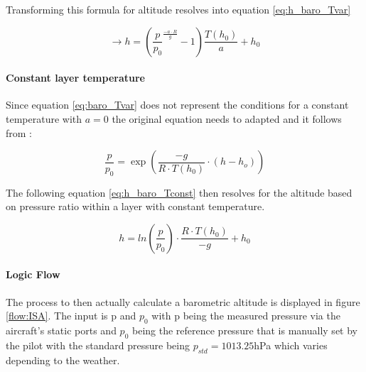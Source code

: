 Transforming this formula for altitude resolves into equation \ref{eq:h_baro_Tvar}

\begin{equation}
    \rightarrow h = \left(\frac{p}{p_0}^{\frac{-a \cdot R}{g}}-1\right)\frac{T(h_0)}{a}+h_0
    \label{eq:h_baro_Tvar}
\end{equation}

\paragraph{Constant layer temperature}

Since equation \ref{eq:baro_Tvar} does not represent the conditions for a constant temperature with $a = 0$ the original equation needs to adapted and it follows from \textcite{iso_standard_1975}:

\begin{equation}
    \frac{p}{p_0}= \exp\left(\frac{-g}{R \cdot T(h_0)}\cdot(h-h_o)\right)
    \label{eq:baro_Tconst}
\end{equation}


The following equation \ref{eq:h_baro_Tconst} then resolves for the altitude based on pressure ratio within a layer with constant temperature.


\begin{equation}
    h = ln(\frac{p}{p_0})\cdot \frac{R \cdot T(h_0)}{-g}+h_0
    \label{eq:h_baro_Tconst}
\end{equation}

\paragraph{Logic Flow}

The process to then actually calculate a barometric altitude is displayed in figure \ref{flow:ISA}. The input is p and $p_0$ with p being the measured pressure via the aircraft's static ports and $p_0$ being the reference pressure that is manually set by the pilot with the standard pressure being $p_{std} = 1013.25$hPa which varies depending to the weather.


